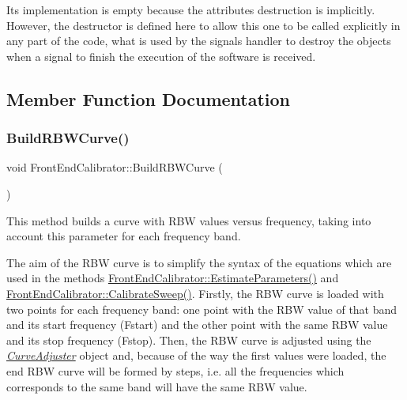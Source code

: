 Its implementation is empty because the attributes destruction is implicitly. However, the destructor is defined here to allow this one to be called explicitly in any part of the code, what is used by the signals handler to destroy the objects when a signal to finish the execution of the software is received. 

\subsection{Member Function Documentation}
\mbox{\label{classFrontEndCalibrator_a97e4fb11d9160b4e56f5f2e2ddcf41a7}} 
\subsubsection{\texorpdfstring{Build\+R\+B\+W\+Curve()}{BuildRBWCurve()}}
{\footnotesize\ttfamily void Front\+End\+Calibrator\+::\+Build\+R\+B\+W\+Curve (\begin{DoxyParamCaption}{ }\end{DoxyParamCaption})}



This method builds a curve with R\+BW values versus frequency, taking into account this parameter for each frequency band. 

The aim of the R\+BW curve is to simplify the syntax of the equations which are used in the methods {\ttfamily \hyperlink{classFrontEndCalibrator_a2d643afa2c6bcf15b0f051cdc34855c2}{Front\+End\+Calibrator\+::\+Estimate\+Parameters()}} and {\ttfamily \hyperlink{classFrontEndCalibrator_afd5775502a0aa05976dccd6142ad46b0}{Front\+End\+Calibrator\+::\+Calibrate\+Sweep()}}. Firstly, the R\+BW curve is loaded with two points for each frequency band\+: one point with the R\+BW value of that band and its start frequency (Fstart) and the other point with the same R\+BW value and its stop frequency (Fstop). Then, the R\+BW curve is adjusted using the {\itshape \hyperlink{classCurveAdjuster}{Curve\+Adjuster}} object and, because of the way the first values ​​were loaded, the end R\+BW curve will be formed by steps, i.\+e. all the frequencies which corresponds to the same band will have the same R\+BW value. \mbox{\label{classFrontEndCalibrator_afd5775502a0aa05976dccd6142ad46b0}} 
